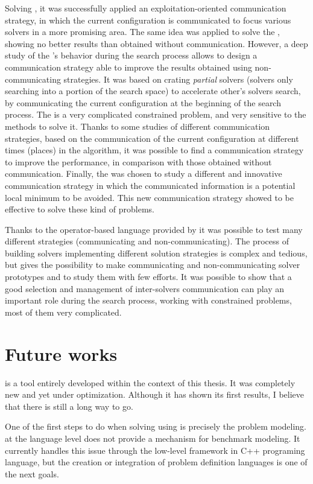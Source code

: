 Solving \sgp{}, it was successfully applied an exploitation-oriented communication strategy, in which the current configuration is communicated to focus various solvers in a more promising area. The same idea was applied to solve the \nqp{}, showing no better results than obtained without communication. However, a deep study of the \posl's behavior during the search process allows to design a communication strategy able to improve the results obtained using non-communicating strategies. It was based on crating \textit{partial} solvers (solvers only searching into a portion of the search space) to accelerate other's solvers search, by communicating the current configuration at the beginning of the search process. The \carrp{} is a very complicated constrained problem, and very sensitive to the methods to solve it. Thanks to some studies of different communication strategies, based on the communication of the current configuration at different times (places) in the algorithm, it was possible to find a communication strategy to improve the performance, in comparison with those obtained without communication. Finally, the \grp{} was chosen to study a different and innovative communication strategy in which the communicated information is a potential local minimum to be avoided. This new communication strategy showed to be effective to solve these kind of problems.

Thanks to the operator-based language provided by \posl{} it was possible to test many different strategies (communicating and non-communicating). The process of building solvers implementing different solution strategies is complex and tedious, but \posl{} gives the possibility to make communicating and non-communicating solver prototypes and to study them with few efforts. It was possible to show that a good selection and management of inter-solvers communication can play an important role during the search process, working with constrained problems, most of them very complicated.

\section{Future works}

\posl{} is a tool entirely developed within the context of this thesis. It was completely new and yet under optimization. Although it has shown its first results, I believe that there is still a long way to go. 

One of the first steps to do when solving \CSPs using \posl{} is precisely the problem modeling. \posl{} at the language level does not provide a mechanism for benchmark modeling. It currently handles this issue through the low-level framework in C++ programing language, but the creation or integration of problem definition languages is one of the next goals.

